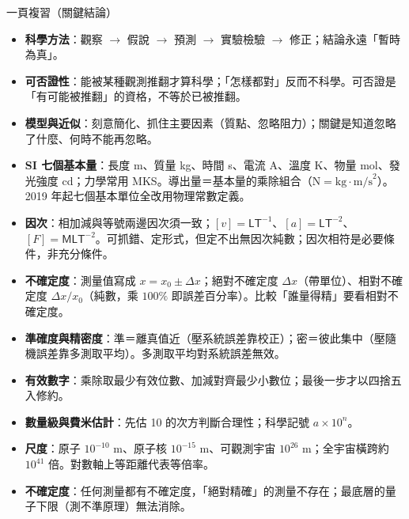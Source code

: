 \documentclass[11pt]{article}
\begin{document}
\begin{補充框}{一頁複習（關鍵結論）}
\begin{itemize}\setlength{\itemsep}{2pt}
\item \textbf{科學方法}：觀察 $\rightarrow$ 假說 $\rightarrow$ 預測 $\rightarrow$ 實驗檢驗 $\rightarrow$ 修正；結論永遠「暫時為真」。
\item \textbf{可否證性}：能被某種觀測推翻才算科學；「怎樣都對」反而不科學。可否證是「有可能被推翻」的資格，不等於已被推翻。
\item \textbf{模型與近似}：刻意簡化、抓住主要因素（質點、忽略阻力）；關鍵是知道忽略了什麼、何時不能再忽略。
\item \textbf{SI 七個基本量}：長度 m、質量 kg、時間 s、電流 A、溫度 K、物量 mol、發光強度 cd；力學常用 MKS。導出量＝基本量的乘除組合（$\text{N}=\text{kg}\cdot\text{m/s}^2$）。2019 年起七個基本單位全改用物理常數定義。
\item \textbf{因次}：相加減與等號兩邊因次須一致；$[v]=\mathsf{L}\mathsf{T}^{-1}$、$[a]=\mathsf{L}\mathsf{T}^{-2}$、$[F]=\mathsf{M}\mathsf{L}\mathsf{T}^{-2}$。可抓錯、定形式，但定不出無因次純數；因次相符是必要條件，非充分條件。
\item \textbf{不確定度}：測量值寫成 $x=x_0\pm\Delta x$；絕對不確定度 $\Delta x$（帶單位）、相對不確定度 $\Delta x/x_0$（純數，乘 $100\%$ 即誤差百分率）。比較「誰量得精」要看相對不確定度。
\item \textbf{準確度與精密度}：準＝離真值近（壓系統誤差靠校正）；密＝彼此集中（壓隨機誤差靠多測取平均）。多測取平均對系統誤差無效。
\item \textbf{有效數字}：乘除取最少有效位數、加減對齊最少小數位；最後一步才以四捨五入修約。
\item \textbf{數量級與費米估計}：先估 10 的次方判斷合理性；科學記號 $a\times10^n$。
\item \textbf{尺度}：原子 $10^{-10}$ m、原子核 $10^{-15}$ m、可觀測宇宙 $10^{26}$ m；全宇宙橫跨約 $10^{41}$ 倍。對數軸上等距離代表等倍率。
\item \textbf{不確定度}：任何測量都有不確定度，「絕對精確」的測量不存在；最底層的量子下限（測不準原理）無法消除。
\end{itemize}
\end{補充框}
\end{document}
